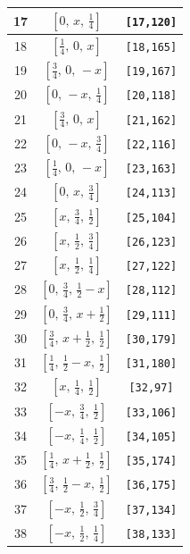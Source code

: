 \documentclass[fleqn,8pt]{jsarticle}
\begin{document}
\begin{longtable}{ccc}
17 & $\left[ 0,\, x,\, \frac{1}{4} \right]$ & {\tt [17,120]} \\ \hline
18 & $\left[ \frac{1}{4},\, 0,\, x \right]$ & {\tt [18,165]} \\ \hline
19 & $\left[ \frac{3}{4},\, 0,\, - x \right]$ & {\tt [19,167]} \\ \hline
20 & $\left[ 0,\, - x,\, \frac{1}{4} \right]$ & {\tt [20,118]} \\ \hline
21 & $\left[ \frac{3}{4},\, 0,\, x \right]$ & {\tt [21,162]} \\ \hline
22 & $\left[ 0,\, - x,\, \frac{3}{4} \right]$ & {\tt [22,116]} \\ \hline
23 & $\left[ \frac{1}{4},\, 0,\, - x \right]$ & {\tt [23,163]} \\ \hline
24 & $\left[ 0,\, x,\, \frac{3}{4} \right]$ & {\tt [24,113]} \\ \hline
25 & $\left[ x,\, \frac{3}{4},\, \frac{1}{2} \right]$ & {\tt [25,104]} \\ \hline
26 & $\left[ x,\, \frac{1}{2},\, \frac{3}{4} \right]$ & {\tt [26,123]} \\ \hline
27 & $\left[ x,\, \frac{1}{2},\, \frac{1}{4} \right]$ & {\tt [27,122]} \\ \hline
28 & $\left[ 0,\, \frac{3}{4},\, \frac{1}{2} - x \right]$ & {\tt [28,112]} \\ \hline
29 & $\left[ 0,\, \frac{3}{4},\, x + \frac{1}{2} \right]$ & {\tt [29,111]} \\ \hline
30 & $\left[ \frac{3}{4},\, x + \frac{1}{2},\, \frac{1}{2} \right]$ & {\tt [30,179]} \\ \hline
31 & $\left[ \frac{1}{4},\, \frac{1}{2} - x,\, \frac{1}{2} \right]$ & {\tt [31,180]} \\ \hline
32 & $\left[ x,\, \frac{1}{4},\, \frac{1}{2} \right]$ & {\tt [32,97]} \\ \hline
33 & $\left[ - x,\, \frac{3}{4},\, \frac{1}{2} \right]$ & {\tt [33,106]} \\ \hline
34 & $\left[ - x,\, \frac{1}{4},\, \frac{1}{2} \right]$ & {\tt [34,105]} \\ \hline
35 & $\left[ \frac{1}{4},\, x + \frac{1}{2},\, \frac{1}{2} \right]$ & {\tt [35,174]} \\ \hline
36 & $\left[ \frac{3}{4},\, \frac{1}{2} - x,\, \frac{1}{2} \right]$ & {\tt [36,175]} \\ \hline
37 & $\left[ - x,\, \frac{1}{2},\, \frac{3}{4} \right]$ & {\tt [37,134]} \\ \hline
38 & $\left[ - x,\, \frac{1}{2},\, \frac{1}{4} \right]$ & {\tt [38,133]} \\ \hline

\end{longtable}
\end{document}
